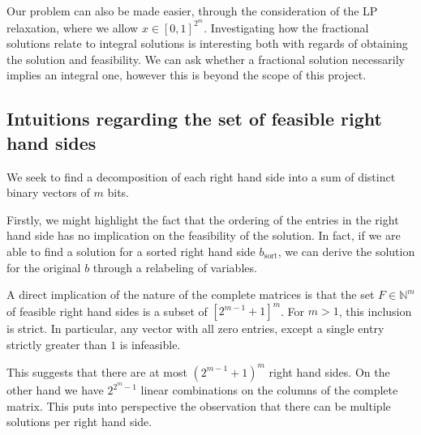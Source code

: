\documentclass{article}
\begin{document}
Our problem can also be made easier, through the consideration of the LP relaxation, where we allow $x \in \left[0, 1\right]^{2^m}$. Investigating how the fractional solutions relate to integral solutions is interesting both with regards of obtaining the solution and feasibility. We can ask whether a fractional solution necessarily implies an integral one, however this is beyond the scope of this project.
\subsection{Intuitions regarding the set of feasible right hand sides}
We seek to find a decomposition of each right hand side into a sum of distinct binary vectors of $m$ bits.

Firstly, we might highlight the fact that the ordering of the entries in the right hand side has no implication on the feasibility of the solution. In fact, if we are able to find a solution for a sorted right hand side $b_\text{sort}$, we can derive the solution for the original $b$ through a relabeling of variables.

A direct implication of the nature of the complete matrices is that the set $F \in \mathbb{N}^m$ of feasible right hand sides is a subset of $\left[2^{m-1}+1\right]^m$.\footnotemark{}  For $m>1$, this inclusion is strict. In particular, any vector with all zero entries, except a single entry strictly greater than $1$ is infeasible. 

This suggests that there are at most $(2^{m-1}+1)^m$ right hand sides. On the other hand we have $2^{2^{m}-1}$ linear combinations on the columns of the complete matrix. This puts into perspective the observation that there can be multiple solutions per right hand side.
\end{document}
